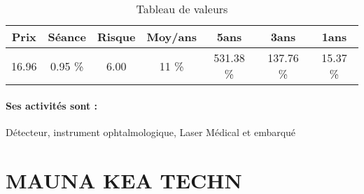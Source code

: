 \documentclass[11pt,a4paper]{report}%
\begin{document}
\begin{table}[H]
  \centering
    \begin{tabular}{|c|c|c|c|c|c|c|}
    \hline
    Prix & Séance & Risque  & Moy/ans & 5ans & 3ans & 1ans \\
    \hline
    16.96 &    0.95 \%    & 6.00 & 11 \% & 531.38 \% & 137.76 \% & 15.37 \% \\
    \hline
    \end{tabular}%
        \label{tab:table_LUMIBIRD}%
      \caption{Tableau de valeurs}
\end{table}%

\paragraph{Ses activités sont : } Détecteur, instrument ophtalmologique, Laser Médical et embarqué 
    
    \newpage

\section{MAUNA KEA TECHN}
\end{document}
